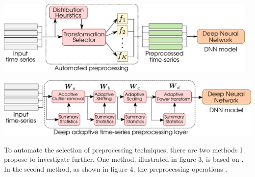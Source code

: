\documentclass[portrait,final,x11names,a1paper,fontscale=0.40]{baposter}
\newcommand{\icl}[1]{{\bf\color{blue_icl2}{#1}}}
\begin{document}
\begin{poster}
{\noindent
\begin{minipage}{.975\textwidth}
    \vspace*{-.6cm}
    \begin{center}
    \includegraphics[width=0.975\textwidth]{Figures/automated-preprocessing-heuristics.pdf} 
    \end{center}
\end{minipage}
\begin{minipage}{.975\textwidth}
    \vspace*{.4cm}
    \vspace*{-.6cm}
    \begin{center}
    \includegraphics[width=\textwidth]{Figures/automated-preprocessing-adaptive.pdf} 
    \end{center}
    \vspace*{.15cm}
\end{minipage}

\noindent
To automate the selection of preprocessing techniques, there are two methods I propose to investigate
further. One method, illustrated in figure 3, is based on \icl{heuristics}. In the second method, as shown in figure 4,
the preprocessing operations \icl{are parameterized and learned as part of the training procedure}.
}


\end{poster}
\end{document}
